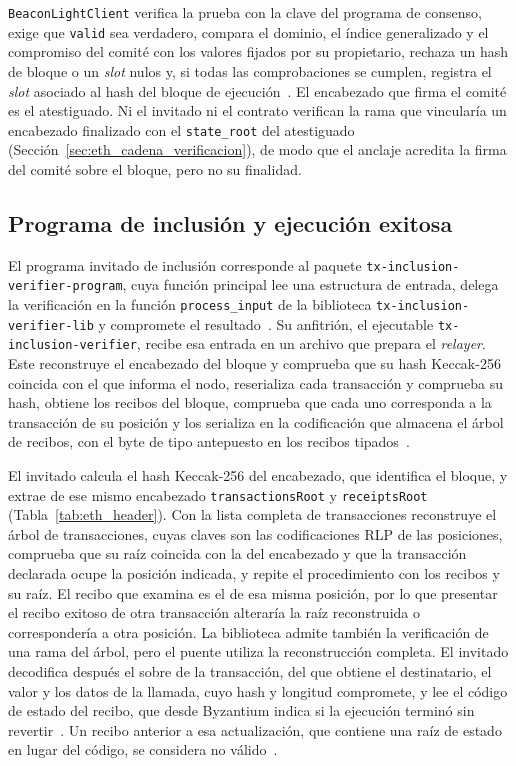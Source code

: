 \texttt{BeaconLightClient} verifica la prueba con la clave del programa de consenso, exige que
\texttt{valid} sea verdadero, compara el dominio, el índice generalizado y el compromiso del comité
con los valores fijados por su propietario, rechaza un hash de bloque o un \textit{slot} nulos y, si
todas las comprobaciones se cumplen, registra el \textit{slot} asociado al hash del bloque de
ejecución~\cite{zkguaranibridgesp1}. El encabezado que firma el comité es el atestiguado. Ni el
invitado ni el contrato verifican la rama que vincularía un encabezado finalizado con el
\texttt{state\_root} del atestiguado (Sección~\ref{sec:eth_cadena_verificacion}), de modo que el
anclaje acredita la firma del comité sobre el bloque, pero no su finalidad.

\subsection{Programa de inclusión y ejecución exitosa}
\label{sec:sp1_impl_inclusion}

\begin{sloppypar}
El programa invitado de inclusión corresponde al paquete \texttt{tx-inclusion-verifier-program}, cuya
función principal lee una estructura de entrada, delega la verificación en la función
\texttt{process\_input} de la biblioteca \texttt{tx-inclusion-verifier-lib} y compromete el
resultado~\cite{txinclusionsp1repo}. Su anfitrión, el ejecutable \texttt{tx-inclusion-verifier},
recibe esa entrada en un archivo que prepara el \textit{relayer}. Este reconstruye el encabezado
del bloque y comprueba que su hash Keccak-256 coincida con el que informa el nodo, reserializa cada
transacción y comprueba su hash, obtiene los recibos del bloque, comprueba que cada uno corresponda
a la transacción de su posición y los serializa en la codificación que almacena el árbol de
recibos, con el byte de tipo antepuesto en los recibos tipados~\cite{zkguaranibridgesp1, eip2718}.
\end{sloppypar}

El invitado calcula el hash Keccak-256 del encabezado, que identifica el bloque, y extrae de ese
mismo encabezado \texttt{transactionsRoot} y \texttt{receiptsRoot} (Tabla~\ref{tab:eth_header}). Con la lista completa de transacciones reconstruye el
árbol de transacciones, cuyas claves son las codificaciones RLP de las posiciones, comprueba que su
raíz coincida con la del encabezado y que la transacción declarada ocupe la posición indicada, y
repite el procedimiento con los recibos y su raíz. El recibo que examina es el de esa misma
posición, por lo que presentar el recibo exitoso de otra transacción alteraría la raíz reconstruida
o correspondería a otra posición. La biblioteca admite también la verificación de una rama del
árbol, pero el puente utiliza la reconstrucción completa. El invitado decodifica después el sobre
de la transacción, del que obtiene el destinatario, el valor y los datos de la llamada, cuyo hash y
longitud compromete, y lee el código de estado del recibo, que desde Byzantium indica si la
ejecución terminó sin revertir~\cite{eip658}. Un recibo anterior a esa actualización, que contiene
una raíz de estado en lugar del código, se considera no válido~\cite{txinclusionsp1repo}.

